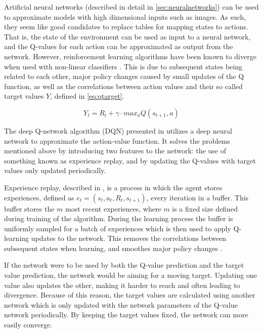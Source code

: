 \documentclass{kththesis}
\begin{document}
Artificial neural networks (described in detail in \autoref{sec:neuralnetworks}) can be used to approximate models with high dimensional inputs such as images. As such, they seem like good candidates to replace tables for mapping states to actions. That is, the state of the environment can be used as input to a neural network, and the Q-values for each action can be approximated as output from the network. However, reinforcement learning algorithms have been known to diverge when used with non-linear classifiers \parencite{tsitsiklis1997analysis}. This is due to subsequent states being related to each other, major policy changes caused by small updates of the Q function, as well as the correlations between action values and their so called target values $Y$, defined in \autoref{eq:qtarget}.

\begin{equation}
\label{eq:qtarget}
Y_t = R_t + \gamma \cdot max_a Q(s_{t+1}, a)
\end{equation}

The deep Q-network algorithm (DQN) presented in \parencite{mnih2015human} utilizes a deep neural network to approximate the action-value function. It solves the problems mentioned above by introducing two features to the network: the use of something known as experience replay, and by updating the Q-values with target values only updated periodically. 

Experience replay, described in \parencite{lin1992self}, is a process in which the agent stores experiences, defined as $e_t = (s_t, a_t, R_t, s_{t+1})$, every iteration in a buffer. This buffer stores the $m$ most recent experiences, where $m$ is a fixed size defined during training of the algorithm. During the learning process the buffer is uniformly sampled for a batch of experiences which is then used to apply Q-learning updates to the network. This removes the correlations between subsequent states when learning, and smoothes major policy changes \parencite{mnih2015human}.

If the network were to be used by both the Q-value prediction and the target value prediction, the network would be aiming for a moving target. Updating one value also updates the other, making it harder to reach and often leading to divergence. Because of this reason, the target values are calculated using another network which is only updated with the network parameters of the Q-value network periodically. By keeping the target values fixed, the network can more easily converge. \parencite{mnih2015human}
\end{document}
